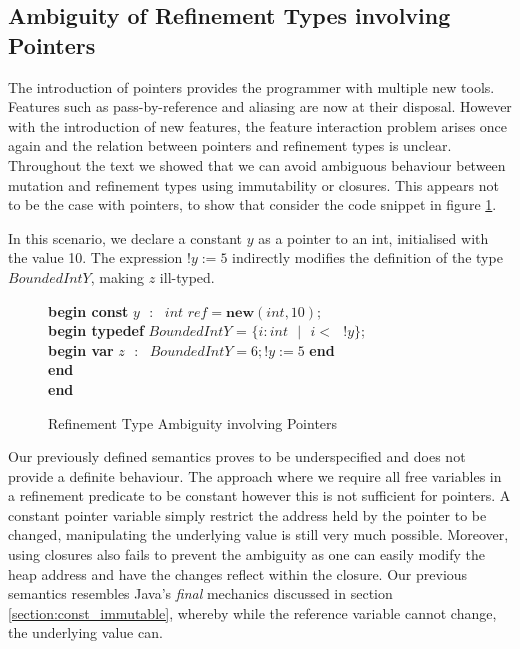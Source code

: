 \documentclass[a4paper,12pt]{report}
\newenvironment{tabs}[1]
 {\flushleft\TabPositions{#1}}
 {\endflushleft}
\begin{document}
\subsection{Ambiguity of Refinement Types involving Pointers}
The introduction of pointers provides the programmer with multiple new tools. 
Features such as pass-by-reference and aliasing are now at their disposal. 
However with the introduction of new features, the feature interaction problem 
arises once again and the relation between pointers and refinement types is 
unclear. Throughout the text we showed that we can avoid ambiguous behaviour 
between mutation and refinement types using immutability or closures. This appears 
not to be the case with pointers, to show that consider the code snippet in figure
\ref{fig:amb_refinement_pointers}. 

\par
In this scenario, we declare a constant $y$ as a pointer to an int, 
initialised with the value 10. The expression $!y := 5$ indirectly modifies 
the definition of the type $BoundedIntY$, making $z$ ill-typed. 

\begin{figure} [H]
  \begin{tabs}{1cm,2cm}
    \textbf{begin const }$y\text{ }:\text{ } int\textit{ ref} = \textbf{new}(int, 10);$\\
    \tab\textbf{begin typedef }$BoundedIntY$ = $\{i : int\text{ }|\text{ }i <\text{ }!y\}$; \\ 
    \tab\tab\textbf{begin var }$z\text{ }:\text{ }BoundedIntY = 6;!y := 5$\textbf { end} \\
    \tab\textbf {end} \\
    \textbf{end}
  \end{tabs}  
  \caption{Refinement Type Ambiguity involving Pointers}
  \label{fig:amb_refinement_pointers}
\end{figure}


\par
Our previously defined semantics proves to be underspecified and does not 
provide a definite behaviour. The approach where we require all free variables in a 
refinement predicate to be constant however this is not sufficient for pointers. 
A constant pointer variable simply restrict the address held by the pointer to be 
changed, manipulating the underlying value is still very much possible. 
Moreover, using closures also fails to prevent the ambiguity as one can easily 
modify the heap address and have the changes reflect within the closure. Our  
previous semantics resembles Java's \textit{final} mechanics discussed in section 
\ref{section:const_immutable}, whereby while the reference variable 
cannot change, the underlying value can.
\end{document}
